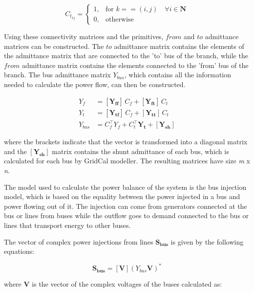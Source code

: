 \begin{equation}
    C_{t_{kj}} =    
    \begin{cases}
    1, & \text{for } k == (i, j) \quad \forall i \in \bm {N}\\
    0, & \text{otherwise}
    \end{cases}
\end{equation}

Using these connectivity matrices and the primitives, $from$ and $to$ admittance matrices can be constructed. The $to$ admittance matrix contains the elements of the 
admittance matrix that are connected to the 'to' bus of the branch, while the $from$ admittance matrix contains the elements connected to the 'from' bus of the branch. 
The bus admittance matrix $Y_{bus}$, which contains all the information needed to calculate the power flow, can then be constructed.

\begin{equation}
    \begin{split}
    Y_f &= [\bm{Y_{ff}}]\, C_f + [\bm{Y_{ft}}]\, C_t \\
    Y_t &= [\bm{Y_{tf}}]\, C_f + [\bm{Y_{tt}}]\, C_t \\
    Y_{bus} &= C_f^\top {Y_f} + C_t^\top \bm{Y_t} + [\bm{Y_{sh}}]
    \end{split}
\end{equation}

where the brackets indicate that the vector is transformed into a diagonal matrix and the $[\bm{Y_{sh}}]$ matrix contains the shunt admittance of each bus,
which is calculated for each bus by GridCal modeller. The resulting matrices have size \textit{m} x \textit{n}.

The model used to calculate the power balance of the system is the bus injection model, which is based on the equality between the power injected in a bus and
power flowing out of it. The injection can come from generators connected at the bus or lines from buses while 
the outflow goes to demand connected to the bus or lines that transport energy to other buses.

The vector of complex power injections from lines $\bm{S_{bus}}$ is given by the following equations:

\begin{equation}
    \bm{S_{bus}} = [\bm{V}] (Y_{bus} \bm{V})^*
    \label{Eq:Sbus}
\end{equation}

where $\bm{V}$ is the vector of the complex voltages of the buses calculated as:

